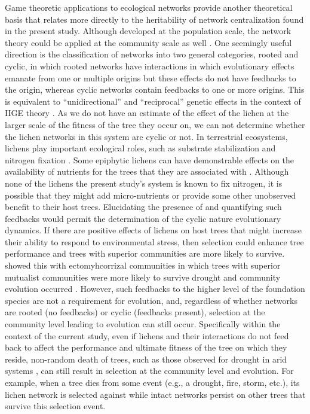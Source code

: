 \documentclass[fleqn,12pt]{olplainarticle}
\begin{document}
Game theoretic applications to ecological networks provide another
theoretical basis that relates more directly to the heritability of
network centralization found in the present study. Although developed
at the population scale, the network theory could be applied at the
community scale as well \citep{Lieberman2005EvolutionaryGraphs}. One
seemingly useful direction is the classification of networks into two
general categories, rooted and cyclic, in which rooted networks have
interactions in which evolutionary effects emanate from one or
multiple origins but these effects do not have feedbacks to the
origin, whereas cyclic networks contain feedbacks to one or more
origins. This is equivalent to ``unidirectional'' and ``reciprocal''
genetic effects in the context of IIGE theory
\citep{Whitham2020IntraspecificEvolution}. As we do not have an
estimate of the effect of the lichen at the larger scale of the
fitness of the tree they occur on, we can not determine whether the
lichen networks in this system are cyclic or not. In terrestrial
ecosystems, lichens play important ecological roles, such as substrate
stabilization \citep{Root2011BioticWashington} and nitrogen fixation
\citep{Nelson2018LichenHelens}. Some epiphytic lichens can have
demonstrable effects on the availability of nutrients for the trees
that they are associated with \citep{Norby1989NitrogenDioxide}.
Although none of the lichens the present study's system is known to
fix nitrogen, it is possible that they might add micro-nutrients or
provide some other unobserved benefit to their host trees. Elucidating
the presence of and quantifying such feedbacks would permit the
determination of the cyclic nature evolutionary dynamics. If there are
positive effects of lichens on host trees that might increase their
ability to respond to environmental stress, then selection could
enhance tree performance and trees with superior communities are more
likely to survive.  \cite{Gehring2014PlantChange, Gehring2017a} showed
this with ectomyhcorrizal communities in which trees with superior
mutualist communities were more likely to survive drought and
community evolution occurred
\citep{Whitham2020IntraspecificEvolution}.  However, such feedbacks to
the higher level of the foundation species are not a requirement for
evolution, and, regardless of whether networks are rooted (no
feedbacks) or cyclic (feedbacks present), selection at the community
level leading to evolution can still occur.  Specifically within the
context of the current study, even if lichens and their interactions
do not feed back to affect the performance and ultimate fitness of the
tree on which they reside, non-random death of trees, such as those
observed for drought in arid systems \cite{Sthultz2009, Gehring2017a},
can still result in selection at the community level and
evolution. For example, when a tree dies from some event (e.g., a
drought, fire, storm, etc.), its lichen network is selected against
while intact networks persist on other trees that survive this
selection event.
\end{document}
